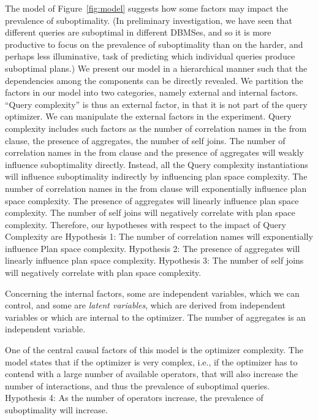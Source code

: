 The model of Figure~\ref{fig:model} suggests how some factors may
impact the prevalence of suboptimality. (In preliminary investigation,
we have seen that different queries are suboptimal in different
DBMSes, and so it is more productive to focus on the prevalence of
suboptimality than on the harder, and perhaps less illuminative, task
of predicting which individual queries produce suboptimal plans.) We
present our model in a hierarchical manner such that the dependencies
among the components can be directly revealed. We partition the
factors in our model into two categories, namely external and internal
factors. ``Query complexity'' is thus an external factor, in that it is 
not part of the query optimizer. We can manipulate the external 
factors in the experiment. Query complexity includes such factors as
the number of correlation names in the from clause, the presence of
aggregates, the number of self joins. The number of correlation names
in the from clause and the presence of aggregates will weakly
influence suboptimality directly. Instead, all the Query complexity
instantiations will influence suboptimality indirectly by influencing
plan space complexity. The number of correlation names in the from
clause will exponentially influence plan space complexity. The
presence of aggregates will linearly influence plan space complexity.
The number of self joins will negatively correlate with plan space
complexity.
Therefore, our hypotheses with respect to the impact of Query Complexity are
Hypothesis 1: The number of correlation names will exponentially influence
Plan space complexity.
Hypothesis 2: The presence of aggregates will linearly influence plan space
complexity.
Hypothesis 3: The number of self joins will negatively correlate with
plan space complexity. 

Concerning the internal factors, some are independent variables, which
we can control, and some are {\em latent variables}, which are derived
from independent variables or which are internal to the optimizer. The
number of aggregates is an independent variable.

One of the central causal factors of this model is the optimizer
complexity. The model states that if the optimizer is very complex,
i.e., if the optimizer has to contend with a large number of available
operators, that will also increase the number of interactions, and
thus the prevalence of suboptimal queries.
Hypothesis 4: As the number of operators increase, the prevalence of suboptimality will increase.

